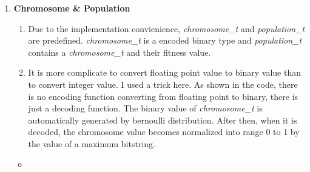 \documentclass{standalone}
\begin{document}
  \begin{enumerate}

    \item \textbf{Chromosome \& Population}
    \begin{enumerate}
      \item Due to the implementation convienience, \emph{chromosome\_t} and \emph{population\_t} are predefined. \emph{chromosome\_t} is a encoded binary type and \emph{population\_t} contains a \emph{chromosome\_t} and their fitness value.
      \item It is more complicate to convert floating point value to binary value than to convert integer value. I used a trick here. As shown in the code, there is no encoding function converting from floating point to binary, there is just a decoding function. The binary value of \emph{chromosome\_t} is automatically generated by bernoulli distribution. After then, when it is decoded, the chromosome value becomes normalized into range 0 to 1 by the value of a maximum bitstring.
    \end{enumerate}
    \begin{itemize}[label=\quad,leftmargin=-5em]
      \item {}
    \end{itemize}


\end{enumerate}
\end{document}

